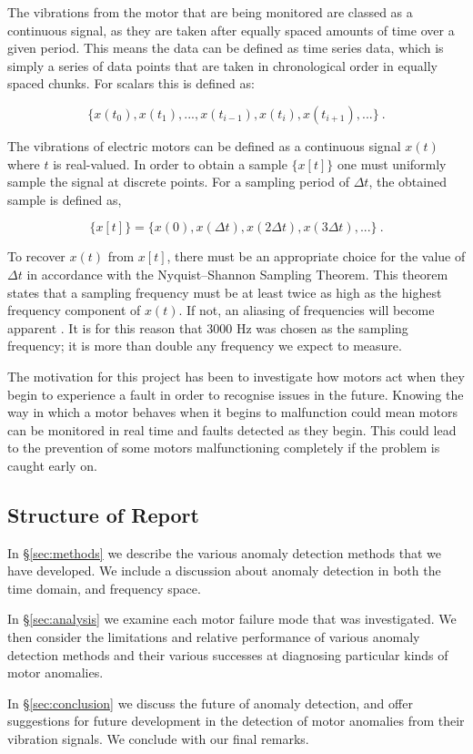 The vibrations from the motor that are being monitored are classed as a continuous signal, as they are taken after equally spaced amounts of time over a given period. This means the data can be defined as time series data, which is simply a series of data points that are taken in chronological order in equally spaced chunks. For scalars this is defined as:

\begin{equation}
    \{x(t_0), x(t_1), ..., x(t_{i-1}), x(t_i), x(t_{i+1}), ...\}~.
\end{equation}

The vibrations of electric motors can be defined as a continuous signal $x(t)$ where $t$ is real-valued. In order to obtain a sample $\{x[t]\}$ one must uniformly sample the signal at discrete points. For a sampling period of $\Delta t$, the obtained sample is defined as,

\begin{equation}
    \{x[t]\} = \{x(0), x(\Delta t), x(2\Delta t), x(3\Delta t),...\}~.
\end{equation}

To recover $x(t)$ from $x[t]$, there must be an appropriate choice for the value of $\Delta t$ in accordance with the Nyquist–Shannon Sampling Theorem. This theorem states that a sampling frequency must be at least twice as high as the highest frequency component of $x(t)$. If not, an aliasing of frequencies will become apparent \cite{Ficker2015}. It is for this reason that 3000 Hz was chosen as the sampling frequency; it is more than double any frequency we expect to measure.

The motivation for this project has been to investigate how motors act when they begin to experience a fault in order to recognise issues in the future. Knowing the way in which a motor behaves when it begins to malfunction could mean motors can be monitored in real time and faults detected as they begin. This could lead to the prevention of some motors malfunctioning completely if the problem is caught early on.


\subsection{Structure of Report}

In \S\ref{sec:methods} we describe the various anomaly detection methods that we have developed. %
We include a discussion about anomaly detection in both the time domain, and frequency space.

In \S\ref{sec:analysis} we examine each motor failure mode that was investigated. We then consider the limitations and relative performance of various anomaly detection methods and their various successes at diagnosing particular kinds of motor anomalies.

In \S\ref{sec:conclusion} we discuss the future of anomaly detection, and offer suggestions for future development in the detection of motor anomalies from their vibration signals. We conclude with our final remarks.